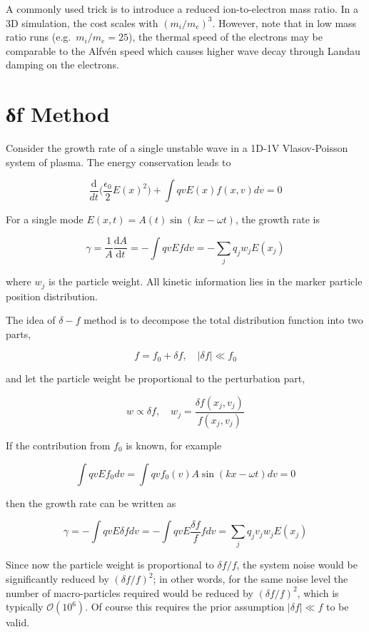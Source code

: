 \documentclass[
  notoc %
]{tufte-book}
\begin{document}
A commonly used trick is to introduce a reduced ion-to-electron mass
ratio. In a 3D simulation, the cost scales with \((m_i/m_e)^3\).
However, note that in low mass ratio runs (e.g.~\(m_i/m_e=25\)), the
thermal speed of the electrons may be comparable to the Alfvén speed
which causes higher wave decay through Landau damping on the electrons.

\hypertarget{sec:delta_f}{%
\section{δf Method}\label{sec:delta_f}}

Consider the growth rate of a single unstable wave in a 1D-1V
Vlasov-Poisson system of plasma. The energy conservation leads to

\[
\frac{\mathrm{d}}{dt}\Big(\frac{\epsilon_0}{2}E(x)^2\Big) + \int q v E(x)f(x,v)dv = 0
\]

For a single mode \(E(x,t) = A(t)\sin(kx-\omega t)\), the growth rate is

\[
\gamma = \frac{1}{A}\frac{\mathrm{d}A}{\mathrm{d}t} = -\int qvEfdv = -\sum_j q_j w_j E(x_j)
\]

where \(w_j\) is the particle weight. All kinetic information lies in
the marker particle position distribution.

The idea of \(\delta-f\) method is to decompose the total distribution
function into two parts,

\[
f = f_0 + \delta f,\quad |\delta f|\ll f_0
\]

and let the particle weight be proportional to the perturbation part,

\[
w\propto \delta f,\quad w_j = \frac{\delta f(x_j, v_j)}{f(x_j, v_j)}
\]

If the contribution from \(f_0\) is known, for example

\[
\int qvE f_0 dv = \int qvf_0(v) A \sin(kx-\omega t)dv = 0
\]

then the growth rate can be written as

\[
\gamma = -\int qvE\delta f dv = -\int qvE\frac{\delta f}{f}f dv = \sum_j q_j v_j w_j E(x_j)
\]

Since now the particle weight is proportional to \(\delta f/f\), the
system noise would be significantly reduced by \((\delta f/f)^2\); in
other words, for the same noise level the number of macro-particles
required would be reduced by \((\delta f/f)^2\), which is typically
\(\mathcal{O}(10^6)\). Of course this requires the prior assumption
\(|\delta f| \ll f\) to be valid.
\end{document}
